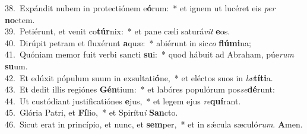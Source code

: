 {38.~}Expándit nubem in protectiónem e\textbf{ó}rum:~* et ignem ut lucéret eis \textit{per} \textbf{no}ctem.\\
{39.~}Petiérunt, et venit co\textbf{túr}nix:~* et pane cæli saturá\textit{vit} \textbf{e}os.\\
{40.~}Dirúpit petram et fluxérunt \textbf{a}quæ:~* abiérunt in sic\textit{co} \textbf{flú}\textbf{mi}na;\\
{41.~}Quóniam memor fuit verbi sancti \textbf{su}i:~* quod hábuit ad Abraham, púe\textit{rum} \textbf{su}um.\\
{42.~}Et edúxit pópulum suum in exsultati\textbf{ó}ne,~* et eléctos suos in \textit{læ}\textbf{tí}\textbf{ti}a.\\
{43.~}Et dedit illis regiónes \textbf{Gén}tium:~* et labóres populórum pos\textit{se}\textbf{dé}runt:\\
{44.~}Ut custódiant justificatiónes \textbf{e}jus,~* et legem ejus \textit{re}\textbf{quí}rant.\\
{45.~}Glória Patri, et \textbf{Fí}lio,~* et Spirítu\textit{i} \textbf{San}cto.\\
{46.~}Sicut erat in princípio, et nunc, et \textbf{sem}per,~* et in sǽcula sæculó\textit{rum}. \textbf{A}men.\\
